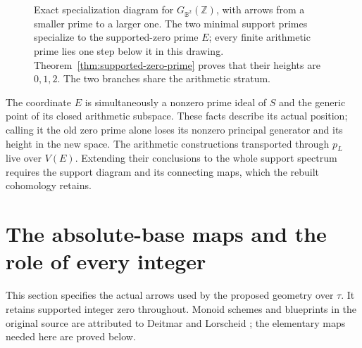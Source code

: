 \documentclass[11pt,a4paper]{article}
\theoremstyle{definition}\newtheorem{definition}[theorem]{Definition}
\newcommand{\Z}{\mathbb Z}\newcommand{\Q}{\mathbb Q}
\newcommand{\B}{\mathbb B}\newcommand{\N}{\mathbb N}
\begin{document}
\begin{figure}[ht]
\centering
{}
\caption{Exact specialization diagram for $G_{\B^2}(\Z)$, with arrows from a smaller prime to a larger one. The two minimal support primes specialize to the supported-zero prime $E$; every finite arithmetic prime lies one step below it in this drawing. Theorem~\ref{thm:supported-zero-prime} proves that their heights are $0,1,2$. The two branches share the arithmetic stratum.}
\label{fig:e-prime}
\end{figure}

The coordinate $E$ is simultaneously a nonzero prime ideal of $S$ and the generic point of its closed arithmetic subspace. These facts describe its actual position; calling it the old zero prime alone loses its nonzero principal generator and its height in the new space. The arithmetic constructions transported through $p_L$ live over $V(E)$. Extending their conclusions to the whole support spectrum requires the support diagram and its connecting maps, which the rebuilt cohomology retains.



\section{The absolute-base maps and the role of every integer}
\label{sec:absolute-base-maps}
This section specifies the actual arrows used by the proposed geometry over
$\tau$. It retains supported integer zero throughout. Monoid schemes and
blueprints in the original source are attributed to Deitmar and Lorscheid
\cite{deitmar,lorscheid}; the elementary maps needed here are proved below.
\end{document}
